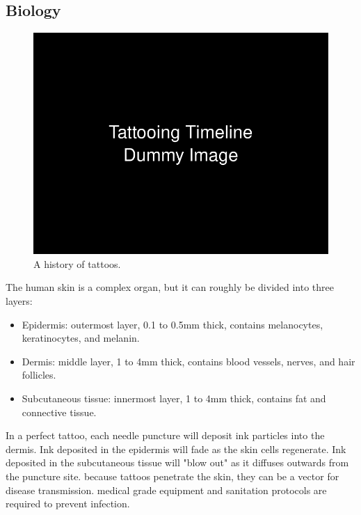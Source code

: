 \documentclass[11pt]{article}
\begin{document}
\subsection{Biology}

\begin{figure}
    \vspace{-20pt}
    \includegraphics[width=\linewidth]{figures/timeline.png}
    \caption{A history of tattoos.}
    \label{fig:timeline_biology}
\end{figure}

The human skin is a complex organ, but it can roughly be divided into three layers:

\begin{itemize}
    \item Epidermis: outermost layer, 0.1 to 0.5mm thick, contains melanocytes, keratinocytes, and melanin.
    \item Dermis: middle layer, 1 to 4mm thick, contains blood vessels, nerves, and hair follicles.
    \item Subcutaneous tissue: innermost layer, 1 to 4mm thick, contains fat and connective tissue.
\end{itemize}

In a perfect tattoo, each needle puncture will deposit ink particles into the dermis.
Ink deposited in the epidermis will fade as the skin cells regenerate.
Ink deposited in the subcutaneous tissue will "blow out" as it diffuses outwards from the puncture site.
because tattoos penetrate the skin, they can be a vector for disease transmission.
medical grade equipment and sanitation protocols are required to prevent infection.
\end{document}
